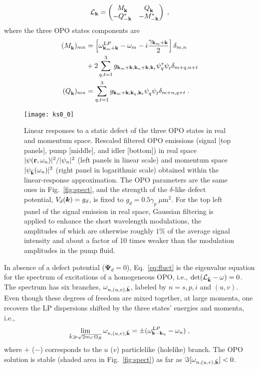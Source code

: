 \begin{equation}\label{eq:bogoliubov-opo}
  \mathcal{L}_{\mathbf{k}} = \begin{pmatrix} M_{\mathbf{k}}^{} & Q_{\mathbf{k}}^{}
    \\ -Q_{-\mathbf{k}}^* & -M_{-\mathbf{k}}^* \end{pmatrix} \; ,
\end{equation}
%
where the three OPO states components are
%
\begin{align}
  (M_{\vt{k}}^{})_{mn} &= \left[\omega^{LP}_{\vt{k}_m + \vt{k}}
    - \omega_m - i\frac{\gamma_{\vt{k}_m + \vt{k}}}{2}\right]
  \delta_{m,n} \\
%
  \nonumber & + 2\sum_{q,t=1}^3
  g_{\vt{k}_m+\vt{k},\vt{k}_n+\vt{k},\vt{k}_t} \psi_q^*
  \psi_t^{} \delta_{m+q,n+t}\\
%
  (Q_{\vt{k}}^{})_{mn} &= \sum_{q,t=1}^3
  g_{\vt{k}_m+\vt{k},\vt{k}_q,\vt{k}_t} \psi_q^{} \psi_t^{}
  \delta_{m+n,q+t}\; .
\end{align}
%
\begin{figure}[tb]
\centering
\texttt{[image: ks0\_0]}
\caption{Linear responses to a static defect of the three OPO states
  in real and momentum space. Rescaled filtered OPO emissions (signal
  [top panels], pump [middle], and idler [bottom]) in real space
  $|\psi (\mathbf{r},\omega_n)|^2/|\psi_n|^2$ (left panels in linear
  scale) and momentum space $|\psi_{\tilde{\mathbf{k}}} (\omega_n)|^2$
  (right panel in logarithmic scale) obtained within the
  linear-response approximation. The OPO parameters are the same ones
  in Fig.~\ref{fig:spect}, and the strength of the $\delta$-like
  defect potential, $V_d(\bm{k}) = g_d$, is fixed to
  $g_d = 0.5 \gamma_p~\mu$m$^2$. For the top left panel of the signal
  emission in real space, Gaussian filtering is applied to enhance the
  short wavelength modulations, the amplitudes of which are otherwise
  roughly $1\%$ of the average signal intensity and about a factor of
  10 times weaker than the modulation amplitudes in the pump fluid.}
\label{fig:ereal}
\end{figure}
%

In absence of a defect potential ($\bm{\Psi}_d =0$),
Eq.~\eqref{eq:fluct} is the eigenvalue equation for the spectrum of
excitations of a homogeneous OPO, i.e.,
$\det(\mathcal{L}_{\tilde{\mathbf{k}}} - \omega)=0$. The spectrum has six
branches, $\omega_{n,(u,v),\tilde{\mathbf{k}}}$, labeled by $n=s,p,i$
and $(u,v)$. Even though these degrees of freedom are mixed together,
at large momenta, one recovers the LP dispersions shifted by the three
states' energies and momenta, i.e.,
%
\begin{equation}
  \lim_{\tilde{k} \gg \sqrt{2m_C \Omega_R}} \omega_{n,(u,v),\tilde{\mathbf{k}}} = \pm
  (\omega^{LP}_{\mathbf{k} - \mathbf{k}_n} - \omega_n)\; ,
\label{eq:large}
\end{equation}
%
where $+$ ($-$) corresponds to the $u$ ($v$) particlelike (holelike)
branch.
%
The OPO solution is stable (shaded area in Fig.~\ref{fig:spect}) as
far as $\Im[\omega_{n,(u,v),\tilde{\mathbf{k}}}] < 0$.

